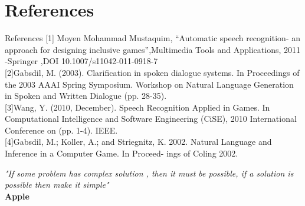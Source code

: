 \documentclass{beamer}
\begin{document}
\section{References}
\begin{frame}{References}
\scriptsize
[1] Moyen Mohammad Mustaquim, “Automatic speech recognition- an approach for designing inclusive games”,Multimedia Tools and Applications, 2011 -Springer
,DOI 10.1007/s11042-011-0918-7\\
\vspace{0.5cm}
[2]Gabsdil, M. (2003). Clarification in spoken dialogue systems. In Proceedings of the 2003 AAAI Spring Symposium. Workshop on Natural Language Generation in Spoken and Written Dialogue (pp. 28-35).\\
\vspace{0.5cm}
[3]Wang, Y. (2010, December). Speech Recognition Applied in Games. In Computational Intelligence and Software Engineering (CiSE), 2010 International Conference on (pp. 1-4). IEEE.\\
\vspace{0.5cm}
[4]Gabsdil, M.; Koller, A.; and Striegnitz, K. 2002. Natural
Language and Inference in a Computer Game. In Proceed-
ings of Coling 2002.
\vspace{0.5cm}
\end{frame}
\begin{frame}
\hfill\LARGE \emph{"If some problem has complex solution , then it must be possible, if a solution is possible then make it simple"}\hspace*{\fill} \\
\hspace{5cm} \textbf{Apple}
\end{frame}
\end{document}
